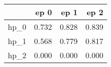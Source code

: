 \begin{tabular}{lrrr}
\toprule
{} &   ep 0 &   ep 1 &   ep 2 \\
\midrule
hp\_0 &  0.732 &  0.828 &  0.839 \\
hp\_1 &  0.568 &  0.779 &  0.817 \\
hp\_2 &  0.000 &  0.000 &  0.000 \\
\bottomrule
\end{tabular}
